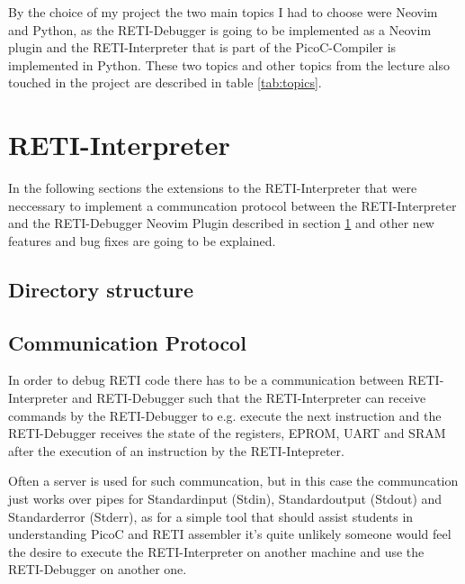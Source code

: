 \documentclass{report}
\begin{document}
By the choice of my project the two main topics I had to choose were \alert{Neovim} and \alert{Python}, as the RETI-Debugger is going to be implemented as a \alert{Neovim plugin} and the RETI-Interpreter that is part of the PicoC-Compiler is implemented in Python. These two topics and other topics from the lecture also touched in the project are described in table \ref{tab:topics}.


\section{RETI-Interpreter}
\label{sec:reti-interpreter}

In the following sections the extensions to the RETI-Interpreter that were neccessary to implement a communcation protocol between the RETI-Interpreter and the RETI-Debugger Neovim Plugin  described in section \ref{sec:reti-interpreter}  and other new features and bug fixes are going to be explained.

\subsection{Directory structure}

\subsection{Communication Protocol}

\sloppy

In order to debug RETI code there has to be a communication between RETI-Interpreter and RETI-Debugger such that the RETI-Interpreter can receive commands by the RETI-Debugger to e.g. execute the next instruction and the RETI-Debugger receives the state of the registers, EPROM, UART and SRAM after the execution of an instruction by the RETI-Intepreter. 

Often a server is used for such communcation, but in this case the communcation just works over \alert{pipes} for Standardinput (\alert{Stdin}), Standardoutput (\alert{Stdout}) and Standarderror (\alert{Stderr}), as for a simple tool that should assist students in understanding PicoC and RETI assembler it's quite unlikely someone would feel the desire to execute the RETI-Interpreter on another machine and use the RETI-Debugger on another one.
\end{document}
